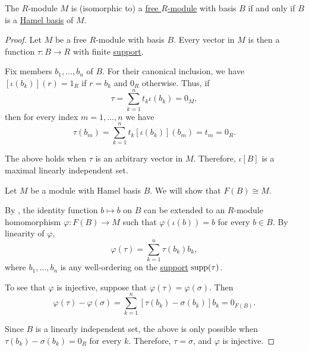 \begin{proposition}\label{thm:free_module_hamel_basis}
  The \( R \)-module \( M \) is (isomorphic to) a \hyperref[def:free_semimodule]{free \( R \)-module} with basis \( B \) if and only if \( B \) is a \hyperref[def:module_linear_dependence]{Hamel basis} of \( M \).
\end{proposition}
\begin{proof}
  \SufficiencySubProof Let \( M \) be a free \( R \)-module with basis \( B \). Every vector in \( M \) is then a function \( \tau: B \to R \) with finite \hyperref[def:function_support]{support}.

  Fix members \( b_1, \ldots, b_n \) of \( B \). For their canonical inclusion, we have \( [\iota(b_k)](r) = 1_R \) if \( r = b_k \) and \( 0_R \) otherwise. Thus, if
  \begin{equation*}
    \tau = \sum_{k=1}^n t_k \iota(b_k) = 0_M,
  \end{equation*}
  then for every index \( m = 1, \ldots, n \) we have
  \begin{equation*}
    \tau(b_m) = \sum_{k=1}^n t_k [\iota(b_k)](b_m) = t_m = 0_R.
  \end{equation*}

  The above holds when \( \tau \) is an arbitrary vector in \( M \). Therefore, \( \iota[B] \) is a maximal linearly independent set.

  \NecessitySubProof Let \( M \) be a module with Hamel basis \( B \). We will show that \( F(B) \cong M \).

  By , the identity function \( b \mapsto b \) on \( B \) can be extended to an \( R \)-module homomorphism \( \varphi: F(B) \to M \) such that \( \varphi(\iota(b)) = b \) for every \( b \in B \). By linearity of \( \varphi \),
  \begin{equation*}
    \varphi(\tau) = \sum_{k=1}^n \tau(b_k) b_k,
  \end{equation*}
  where \( b_1, \ldots, b_n \) is any well-ordering on the \hyperref[def:function_support]{support} \( \operatorname{supp}(\tau) \).

  To see that \( \varphi \) is injective, suppose that \( \varphi(\tau) = \varphi(\sigma) \). Then
  \begin{equation*}
    \varphi(\tau) - \varphi(\sigma) = \sum_{k=1}^n [\tau(b_k) - \sigma(b_k)] b_k = 0_{F(B)}.
  \end{equation*}

  Since \( B \) is a linearly independent set, the above is only possible when \( \tau(b_k) - \sigma(b_k) = 0_R \) for every \( k \). Therefore, \( \tau = \sigma \), and \( \varphi \) is injective.


\end{proof}
